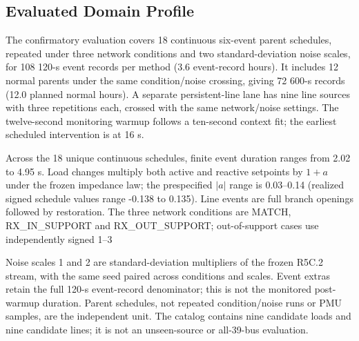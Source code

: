 \subsection{Evaluated Domain Profile}

\label{app:domain-profile}

The confirmatory evaluation covers 18 continuous six-event parent schedules, repeated under three network conditions and two standard-deviation noise scales, for 108 120-s event records per method (3.6 event-record hours). It includes 12 normal parents under the same condition/noise crossing, giving 72 600-s records (12.0 planned normal hours). A separate persistent-line lane has nine line sources with three repetitions each, crossed with the same network/noise settings. The twelve-second monitoring warmup follows a ten-second context fit; the earliest scheduled intervention is at 16 s.

Across the 18 unique continuous schedules, finite event duration ranges from 2.02 to 4.95 s. Load changes multiply both active and reactive setpoints by $1+a$ under the frozen impedance law; the prespecified $|a|$ range is 0.03--0.14 (realized signed schedule values range -0.138 to 0.135). Line events are full branch openings followed by restoration. The three network conditions are MATCH, RX\_IN\_SUPPORT and RX\_OUT\_SUPPORT; out-of-support cases use independently signed 1--3%

Noise scales 1 and 2 are standard-deviation multipliers of the frozen R5C.2 stream, with the same seed paired across conditions and scales. Event extras retain the full 120-s event-record denominator; this is not the monitored post-warmup duration. Parent schedules, not repeated condition/noise runs or PMU samples, are the independent unit. The catalog contains nine candidate loads and nine candidate lines; it is not an unseen-source or all-39-bus evaluation.
